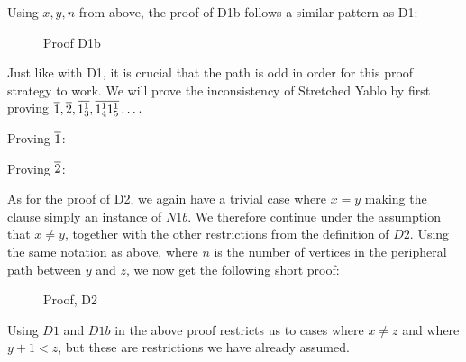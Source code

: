 Using $x,y,n$ from above, the proof of D1b follows a similar pattern as D1:\par
\begin{figure}[!h]
  \centering
  \begin{prooftree*}
  \end{prooftree*}
  \caption{Proof D1b}
  \label{fig:proof_d1b}
\end{figure}
Just like with D1, it is crucial that the path is odd in order for this proof strategy to work.
We will prove the inconsistency of Stretched Yablo by first proving $\ol{1},\ol{2},\ol{1^1_3},\ol{1^1_4}\ol{1^1_5}\dots$.

Proving $\ol{1}$:
\begin{prooftree*}
  \Hypo{\dots}
\end{prooftree*}

Proving $\ol{2}$:
\begin{prooftree*}
  \Hypo{\dots}
\end{prooftree*}
As for the proof of D2, we again have a trivial case where $x = y$ making the clause simply an instance of $N1b$.
We therefore continue under the assumption that $x \neq y$, together with the other restrictions from the definition of $D2$.
Using the same notation as above, where $n$ is the number of vertices in the peripheral path between $y$ and $z$, we now get the following short proof:\par
\begin{figure}[!h]
  \centering
  \begin{prooftree*}
  \end{prooftree*}
  \caption{Proof, D2}
  \label{fig:proof_d2}
\end{figure}
\FloatBarrier
Using $D1$ and $D1b$ in the above proof restricts us to cases where $x \neq z$ and where $y+1 < z$, but these are restrictions we have already assumed.

